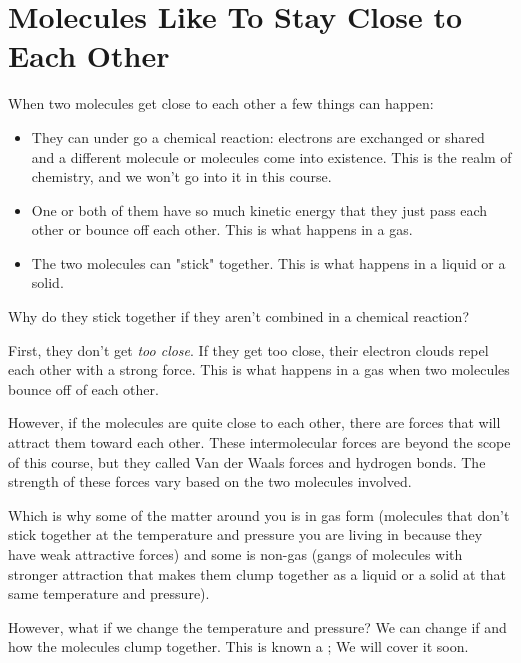 \section{Molecules Like To Stay Close to Each Other}

When two molecules get close to each other a few things can happen:
\begin{itemize} 
\item They can under go a chemical reaction: electrons are exchanged or shared and a different molecule or molecules come into existence. 
This is the realm of chemistry, and we won't go into it in this course.
\item One or both of them have so much kinetic energy that they just pass each other or bounce off each other. This is what happens in a gas.
\item The two molecules can "stick" together. This is what happens in a liquid or a solid.
\end{itemize}

Why do they stick together if they aren't combined in a chemical reaction?

First, they don't get \emph{too close}. If they get too close, their electron clouds repel each other with a strong force. 
This is what happens in a gas when two molecules bounce off of each other.

However, if the molecules are quite close to each other, there are forces that will attract them toward each other. 
These intermolecular forces are beyond the scope of this course, but they called Van der Waals forces and hydrogen bonds.  
The strength of these forces vary based on the two molecules involved. 

Which is why some of the matter around you is in gas form (molecules that don't stick together at the temperature and pressure you are living in because they have weak attractive forces) and some is non-gas 
(gangs of molecules with stronger attraction that makes them clump together as a liquid or a solid at that same temperature and pressure).

However, what if we change the temperature and pressure? We can change if and how the molecules clump together. 
This is known a ; We will cover it soon.
